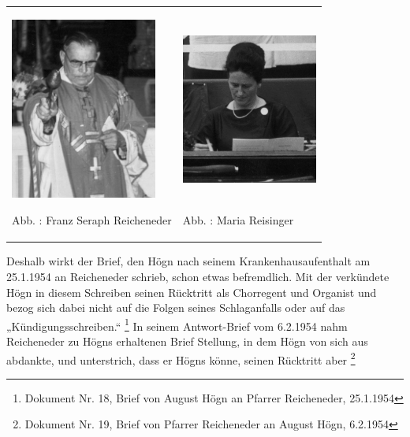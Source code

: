 \begin{center}
\begin{minipage}{10.084cm}
\begin{flushleft}
\tablefirsthead{}
\tablehead{}
\tabletail{}
\tablelasttail{}
\begin{supertabular}{m{5.018cm}m{4.6670003cm}}

\includegraphics[width=4.835cm,height=5.992cm]{pictures/zulassungsarbeit-img051.jpg}

Abb. : Franz Seraph Reicheneder &

\includegraphics[width=4.484cm,height=6.003cm]{pictures/zulassungsarbeit-img052.jpg}

Abb. : Maria Reisinger\\
\end{supertabular}
\end{flushleft}
\end{minipage}
\end{center}
Deshalb wirkt der Brief, den Högn nach seinem Krankenhausaufenthalt am
25.1.1954 an Reicheneder schrieb, schon etwas befremdlich. Mit der
 verkündete Högn in diesem Schreiben seinen
Rücktritt als Chorregent und Organist und bezog sich dabei nicht auf
die Folgen seines Schlaganfalls oder auf das „Kündigungsschreiben.“
 \footnote{Dokument Nr. 18, Brief von August Högn an Pfarrer
Reicheneder, 25.1.1954} In seinem Antwort-Brief vom 6.2.1954 nahm
Reicheneder zu Högns erhaltenen Brief Stellung, in dem Högn von sich
aus abdankte, und unterstrich, dass er Högns
 könne, seinen
Rücktritt aber  \footnote{Dokument
Nr. 19, Brief von Pfarrer Reicheneder an August Högn, 6.2.1954}


